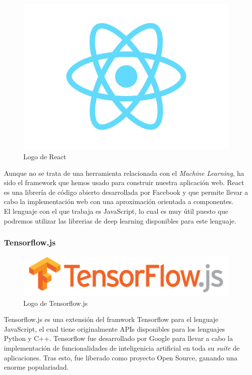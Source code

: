 \documentclass[a4paper]{article}
\begin{document}
\begin{figure}[ht]
    \centering
    \includegraphics[scale=0.05]{images/react-logo.png}
    \caption{Logo de React}
    \label{fig:my_label}
\end{figure}

Aunque no se trata de una herramienta relacionada con el \textit{Machine Learning}, ha sido el 
framework que hemos usado para construir nuestra aplicación web. React es una librería de código 
abierto desarrollada por Facebook y que permite llevar a cabo la implementación web con una 
aproximación orientada a componentes.\\

El lenguaje con el que trabaja es JavaScript, lo cual es muy útil puesto que podremos utilizar las 
librerias de deep learning disponibles para este lenguaje.

\subsubsection{Tensorflow.js}

\begin{figure}[h]
    \centering
    \includegraphics[scale=0.3]{images/tfjs-logo.png}
    \caption{Logo de Tensorflow.js}
    \label{fig:my_label}
\end{figure}

Tensorflow.js es una extensión del framwork Tensorflow para el lenguaje JavaScript, el cual tiene 
originalmente APIs disponibles para los lenguajes Python y C++. Tensorflow fue desarrollado por Google
para llevar a cabo la implementación de funcionalidades de inteligenicia artificial en toda su 
\textit{suite} de aplicaciones. Tras esto, fue liberado como proyecto Open Source, ganando una enorme 
populariadad. \\
\end{document}

